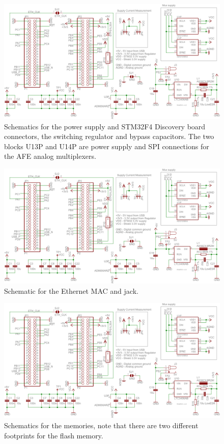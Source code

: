 \begin{figure}[htpb]
  \centering
    \includegraphics[angle=90,page=1]{bilder/schem.pdf}
  \caption{Schematics for the power supply and STM32F4 Discovery board connectors, the switching regulator and bypass
    capacitors. The two blocks U13P and U14P are power supply and SPI connections for the AFE analog multiplexers.}
  \label{fig:schem_power}
\end{figure}

\begin{figure}[htpb]
  \centering
    \includegraphics[angle=90,page=4]{bilder/schem.pdf}
  \caption{Schematic for the Ethernet MAC and jack.}
  \label{fig:schem_ethernet}
\end{figure}

\begin{figure}[htpb]
  \centering
    \includegraphics[page=3]{bilder/schem.pdf}
  \caption{Schematics for the memories, note that there are two different footprints for the flash memory.}
  \label{fig:schem_memory}
\end{figure}

